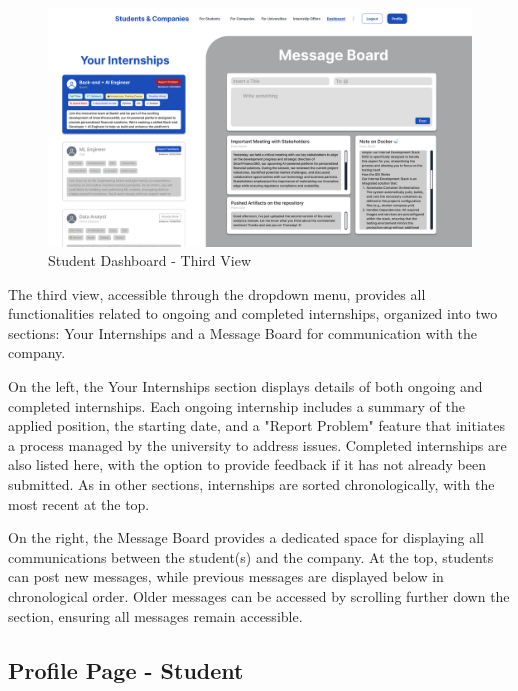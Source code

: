 \begin{figure} [H]
    \begin{center}
        \includegraphics[width=0.9\linewidth]{LaTeXCode/images/UI/Student Dashboard - Third View.png}
        \caption{Student Dashboard - Third View}
        \label{fig: dashboard_student_third}
    \end{center}
\end{figure}

The third view, accessible through the dropdown menu, provides all functionalities related to ongoing and completed internships, organized into two sections: Your Internships and a Message Board for communication with the company.

On the left, the Your Internships section displays details of both ongoing and completed internships. Each ongoing internship includes a summary of the applied position, the starting date, and a "Report Problem" feature that initiates a process managed by the university to address issues. Completed internships are also listed here, with the option to provide feedback if it has not already been submitted. As in other sections, internships are sorted chronologically, with the most recent at the top.

On the right, the Message Board provides a dedicated space for displaying all communications between the student(s) and the company. At the top, students can post new messages, while previous messages are displayed below in chronological order. Older messages can be accessed by scrolling further down the section, ensuring all messages remain accessible.

\subsection{Profile Page - Student}
\label{subsec: profile_page_student}

